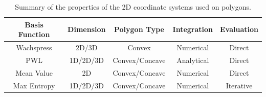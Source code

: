 \begin{table}
\centering
\caption{Summary of the properties of the 2D coordinate systems used on polygons.}
\begin{tabular}{|c|c|c|c|c|}
\hline
Basis Function & Dimension & Polygon Type & Integration & Evaluation \\
\hline \hline
Wachspress	&2D/3D&	Convex&	Numerical	&Direct\\ \hline
PWL&	1D/2D/3D&	Convex/Concave&	Analytical	&Direct\\ \hline
Mean Value&	2D&	Convex/Concave&	Numerical	&Direct\\ \hline
Max Entropy&	1D/2D/3D	&Convex/Concave&	Numerical&	Iterative\\ \hline
\end{tabular}
\label{tab::BF_2Dlin_summary}
\end{table}

